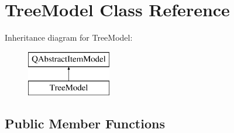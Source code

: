 \hypertarget{class_tree_model}{}\section{Tree\+Model Class Reference}
\label{class_tree_model}
Inheritance diagram for Tree\+Model\+:\begin{figure}[H]
\begin{center}
\leavevmode
\includegraphics[height=2.000000cm]{class_tree_model}
\end{center}
\end{figure}
\subsection*{Public Member Functions}
